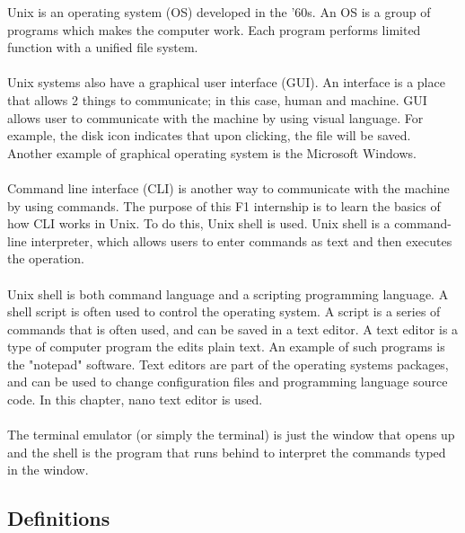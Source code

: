 \documentclass{article}
\begin{document}
Unix is an operating system (OS) developed in the '60s. An OS is a group of programs which makes the computer work. Each program performs limited function with a unified file system.\\
\\
Unix systems also have a graphical user interface (GUI). An interface is a place that allows 2 things to communicate; in this case, human and machine. GUI allows user to communicate with the machine by using visual language. For example, the disk icon indicates that upon clicking, the file will be saved. Another example of graphical operating system is the Microsoft Windows.\\
\\
Command line interface (CLI) is another way to communicate with the machine by using commands. The purpose of this F1 internship is to learn the basics of how CLI works in Unix. To do this, Unix shell is used. Unix shell is a command-line interpreter, which allows users to enter commands as text and then executes the operation.\\
\\
Unix shell is both command language and a scripting programming language. A shell script is often used to control the operating system. A script is a series of commands that is often used, and can be saved in a text editor. A text editor is a type of computer program the edits plain text. An example of such programs is the "notepad" software. Text editors are part of the operating systems packages, and can be used to change configuration files and programming language source code. In this chapter, nano text editor is used. \\
\\
The terminal emulator (or simply the terminal) is just the window that opens up and the shell is the program that runs behind to interpret the commands typed in the window. 

\subsection{Definitions}
\end{document}
